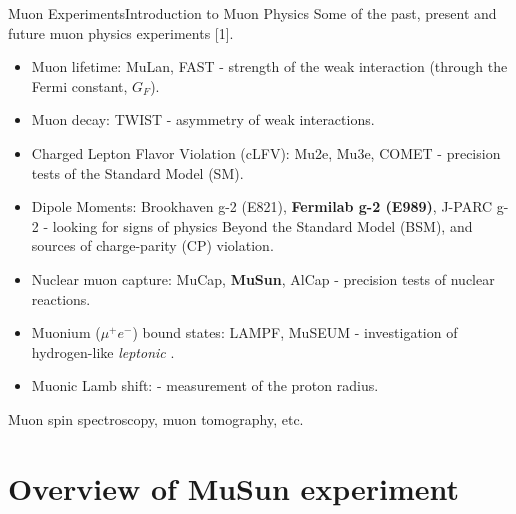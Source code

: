 \documentclass{beamer}
\newcommand\Fontvi{\fontsize{9}{7.2}\selectfont}
\begin{document}

\begin{frame}{Muon Experiments}{Introduction to Muon Physics}
Some of the past, present and future muon physics experiments [1]. 
\Fontvi
\begin{itemize}
    \item Muon lifetime: MuLan, FAST - strength of the weak interaction (through the Fermi constant, $G_F$).
    \item Muon decay: TWIST - asymmetry of weak interactions. 
\item Charged Lepton Flavor Violation (cLFV): Mu2e, Mu3e, COMET - precision tests of the Standard Model (SM).
\item Dipole Moments:  Brookhaven g-2 (E821), \textbf{Fermilab g-2 (E989)}, J-PARC g-2 - looking for signs of physics Beyond the Standard Model (BSM), and sources of charge-parity (CP) violation. 
\item Nuclear muon capture: MuCap, \textbf{MuSun}, AlCap  - precision tests of nuclear reactions.  
\item Muonium ($\mu^+e^-$) bound states: LAMPF, MuSEUM - investigation of hydrogen-like \textit{leptonic} .   
\item Muonic Lamb shift: - measurement of the proton radius. \\
\end{itemize}

Muon spin spectroscopy, muon tomography, etc. 
\let\thefootnote\relax{}
\end{frame}

\section{Overview of MuSun experiment}
\end{document}
